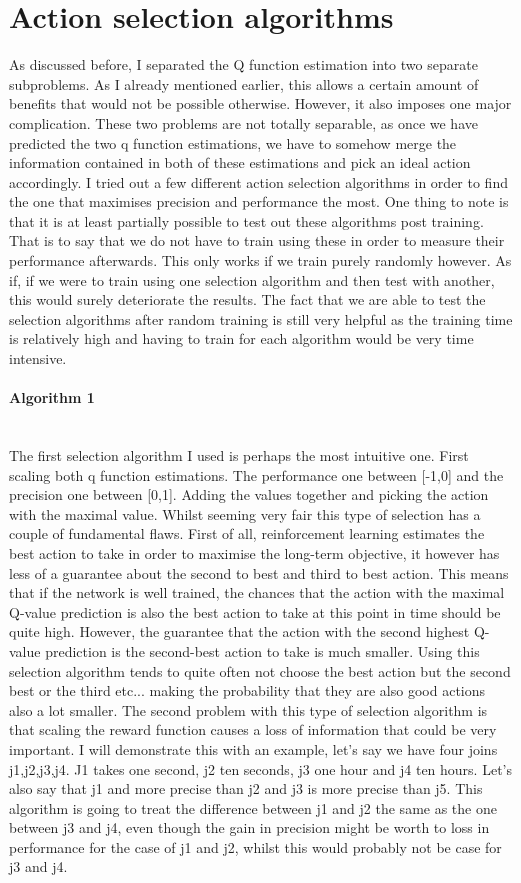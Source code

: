 \section{Action selection algorithms}
As discussed before, I separated the Q function estimation into two separate subproblems. As I already mentioned earlier, this allows a certain amount of benefits that would not be possible otherwise. However, it also imposes one major complication. These two problems are not totally separable, as once we have predicted the two q function estimations, we have to somehow merge the information contained in both of these estimations and pick an ideal action accordingly. I tried out a few different action selection algorithms in order to find the one that maximises precision and performance the most. One thing to note is that it is at least partially possible to test out these algorithms post training. That is to say that we do not have to train using these in order to measure their performance afterwards. This only works if we train purely randomly however. As if, if we were to train using one selection algorithm and then test with another, this would surely deteriorate the results. The fact that we are able to test the selection algorithms after random training is still very helpful as the training time is relatively high and having to train for each algorithm would be very time intensive.
\paragraph{Algorithm 1}\mbox{}\\
The first selection algorithm I used is perhaps the most intuitive one. First scaling both q function estimations. The performance one between [-1,0] and the precision one between [0,1]. Adding the values together and picking the action with the maximal value. Whilst seeming very fair this type of selection has a couple of fundamental flaws. First of all, reinforcement learning estimates the best action to take in order to maximise the long-term objective, it however has less of a guarantee about the second to best and third to best action. This means that if the network is well trained, the chances that the action with the maximal Q-value prediction is also the best action to take at this point in time should be quite high. However, the guarantee that the action with the second highest Q-value prediction is the second-best action to take is much smaller. Using this selection algorithm tends to quite often not choose the best action but the second best or the third etc... making the probability that they are also good actions also a lot smaller. The second problem with this type of selection algorithm is that scaling the reward function causes a loss of information that could be very important. I will demonstrate this with an example, %
let's say we have four joins j1,j2,j3,j4. J1 takes one second, j2 ten seconds, j3 one hour and j4 ten hours. Let's also say that j1 and more precise than j2 and j3 is more precise than j5. This algorithm is going to treat the difference between j1 and j2 the same as the one between j3 and j4, even though the gain in precision might be worth to loss in performance for the case of j1 and j2, whilst this would probably not be case for j3 and j4.
